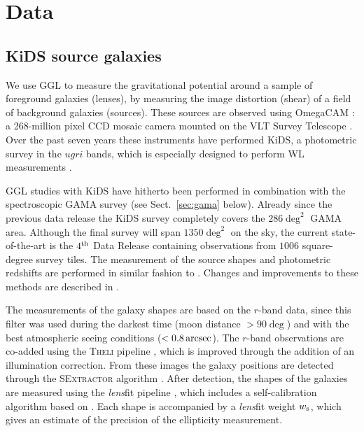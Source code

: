 \documentclass[usenatbib]{mnras}
\newcommand{\as}{\, {\rm arcsec}}
\newcommand{\un}[1]{_{\rm #1}}
\begin{document}
\section{Data}
\label{sec:data}

\subsection{KiDS source galaxies}
\label{sec:kids}

We use GGL to measure the gravitational potential around a sample of foreground galaxies (lenses), by measuring the image distortion (shear) of a field of background galaxies (sources). These sources are observed using OmegaCAM \cite[]{kuijken2011}: a 268-million pixel CCD mosaic camera mounted on the VLT Survey Telescope \cite[]{capaccioli2011}. Over the past seven years these instruments have performed KiDS, a photometric survey in the $ugri$ bands, which is especially designed to perform WL measurements \cite[]{dejong2013}.

GGL studies with KiDS have hitherto been performed in combination with the spectroscopic GAMA survey (see Sect.~\ref{sec:gama} below). Already since the previous data release \cite[KiDS-DR3,][]{dejong2017} the KiDS survey completely covers the $286 \deg^2$ GAMA area. Although the final survey will span $1350 \deg^2$ on the sky, the current state-of-the-art is the $4^{\rm th}$ Data Release \cite[KiDS-DR4,][]{kuijken2019} containing observations from $1006$ square-degree survey tiles. The measurement of the source shapes and photometric redshifts are performed in similar fashion to \cite{dejong2017}. Changes and improvements to these methods are described in \cite{kuijken2019}. 

The measurements of the galaxy shapes are based on the $r$-band data, since this filter was used during the darkest time (moon distance $> 90 \deg$) and with the best atmospheric seeing conditions ($<0.8 \as$). The $r$-band observations are co-added using the {\scshape Theli} pipeline \cite[]{erben2013}, which is improved through the addition of an illumination correction. From these images the galaxy positions are detected through the {\scshape SExtractor} algorithm \cite[]{bertin1996}. After detection, the shapes of the galaxies are measured using the \emph{lens}fit pipeline \cite[]{miller2007,miller2013}, which includes a self-calibration algorithm based on \cite{fenechconti2017}. Each shape is accompanied by a \emph{lens}fit weight $w\un{s}$, which gives an estimate of the precision of the ellipticity measurement.
\end{document}
